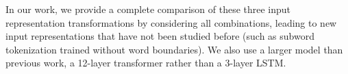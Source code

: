 In our work, we provide a complete comparison of these three input representation transformations by considering all combinations, leading to new input representations that have not been studied before (such as subword tokenization trained without word boundaries). We also use a larger model than previous work, a 12-layer transformer rather than a 3-layer LSTM.





